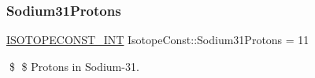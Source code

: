 \subsubsection{\texorpdfstring{Sodium31\+Protons}{Sodium31Protons}}
{\footnotesize\ttfamily \mbox{\hyperlink{group___isotope_const-_macros_ga5f18360b3e99483a35c32d789e62621c}{I\+S\+O\+T\+O\+P\+E\+C\+O\+N\+S\+T\+\_\+\+I\+NT}} Isotope\+Const\+::\+Sodium31\+Protons = 11}

\$ \$ Protons in Sodium-\/31. 